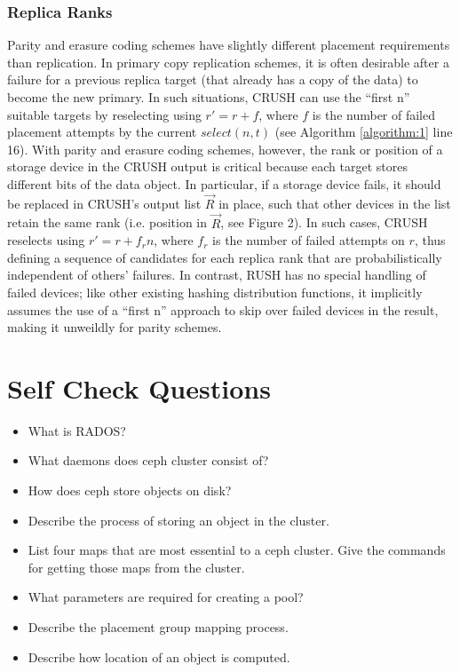 \documentclass[12pt,a4paper]{report}
\begin{document}
\subsubsection{Replica Ranks}
Parity and erasure coding schemes have slightly different placement
requirements than replication. In primary copy replication schemes, it is often
desirable after a failure for a previous replica target (that already has a
copy of the data) to become the new primary. In such situations, CRUSH can use
the ``first n'' suitable targets by reselecting using $r' = r + f$, where $f$
is the number of failed placement attempts by the current $select(n,t)$ (see
Algorithm \ref{algorithm:1} line 16). With parity and erasure coding schemes,
however, the rank or position of a storage device in the CRUSH output is
critical because each target stores different bits of the data object. In
particular, if a storage device fails, it should be replaced in CRUSH’s output
list $\vec{R}$ in place, such that other devices in the list retain the same
rank (i.e. position in $\vec{R}$, see Figure 2). In such cases, CRUSH reselects
using $r' = r + f_rn$, where $f_r$ is the number of failed attempts on $r$,
thus defining a sequence of candidates for each replica rank that are
probabilistically independent of others’ failures. In contrast, RUSH has no
special handling of failed devices; like other existing hashing distribution
functions, it implicitly assumes the use of a ``first n'' approach to skip over
failed devices in the result, making it unweildly for parity schemes.

\section{Self Check Questions}

\begin{itemize}
	\item What is RADOS?

	\item What daemons does ceph cluster consist of?

	\item How does ceph store objects on disk?

	\item Describe the process of storing an object in the cluster.

	\item List four maps that are most essential to a ceph cluster. Give
		the commands for getting those maps from the cluster.

	\item What parameters are required for creating a pool?

	\item Describe the placement group mapping process.

	\item Describe how location of an object is computed.
\end{itemize}
\end{document}
